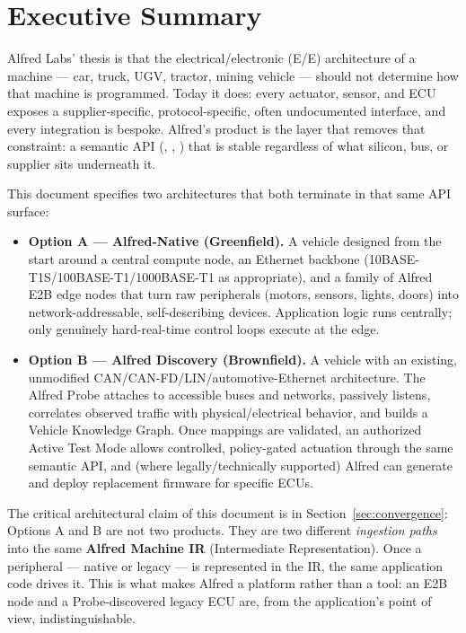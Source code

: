 \section{Executive Summary}
\label{sec:exec-summary}

Alfred Labs' thesis is that the electrical/electronic (E/E) architecture of a machine --- car, truck, UGV, tractor, mining vehicle --- should not determine how that machine is programmed. Today it does: every actuator, sensor, and ECU exposes a supplier-specific, protocol-specific, often undocumented interface, and every integration is bespoke. Alfred's product is the layer that removes that constraint: a semantic API (, , ) that is stable regardless of what silicon, bus, or supplier sits underneath it.

This document specifies two architectures that both terminate in that same API surface:

\begin{itemize}
\item \textbf{Option A --- Alfred-Native (Greenfield).} A vehicle designed from the start around a central compute node, an Ethernet backbone (10BASE-T1S/100BASE-T1/1000BASE-T1 as appropriate), and a family of Alfred E2B edge nodes that turn raw peripherals (motors, sensors, lights, doors) into network-addressable, self-describing devices. Application logic runs centrally; only genuinely hard-real-time control loops execute at the edge.
\item \textbf{Option B --- Alfred Discovery (Brownfield).} A vehicle with an existing, unmodified CAN/CAN-FD/LIN/automotive-Ethernet architecture. The Alfred Probe attaches to accessible buses and networks, passively listens, correlates observed traffic with physical/electrical behavior, and builds a Vehicle Knowledge Graph. Once mappings are validated, an authorized Active Test Mode allows controlled, policy-gated actuation through the same semantic API, and (where legally/technically supported) Alfred can generate and deploy replacement firmware for specific ECUs.
\end{itemize}

The critical architectural claim of this document is in Section~\ref{sec:convergence}: Options A and B are not two products. They are two different \emph{ingestion paths} into the same \textbf{Alfred Machine IR} (Intermediate Representation). Once a peripheral --- native or legacy --- is represented in the IR, the same application code drives it. This is what makes Alfred a platform rather than a tool: an E2B node and a Probe-discovered legacy ECU are, from the application's point of view, indistinguishable.

